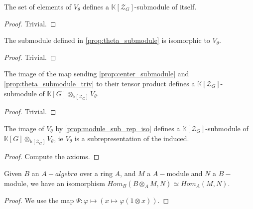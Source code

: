 \begin{proposition}
    \label{prop:theta_submodule}
    \uses{}
    \leanok 
    The set of elements of $V_\theta$ defines a $\mathbb{K}[\mathcal{Z}_G]$-submodule of itself.
\end{proposition}
\begin{proof}
    \leanok
    Trivial.
\end{proof}

\begin{proposition}
    \label{prop:theta_submodule_triv}
    \leanok 
    The submodule defined in \ref{prop:theta_submodule} is isomorphic to $V_\theta$.
\end{proposition}
\begin{proof}
    \leanok
    Trivial.
\end{proof}

\begin{proposition}
    \label{prop:center_times_theta_submodule}
    \leanok 
    The image of the map sending \ref{prop:center_submodule} and \ref{prop:theta_submodule_triv}
    to their tensor product defines a $\mathbb{K}[\mathcal{Z}_G]$-submodule of 
    $\mathbb{K}[G]\otimes_{\mathbb{k}[\mathcal{Z}_G]}V_\theta$.
\end{proposition}
\begin{proof}
    \leanok
    Trivial.
\end{proof}

\begin{proposition}
    \label{prop:subsubsub}
    \leanok 
    The image of $V_\theta$ by \ref{prop:module_sub_rep_iso} defines a $\mathbb{K}[\mathcal{Z}_G]$-submodule of 
    $\mathbb{K}[G]\otimes_{\mathbb{k}[\mathcal{Z}_G]}V_\theta$, ie $V_\theta$ is a 
    subrepresentation of the induced.
\end{proposition}
\begin{proof}
    \leanok
    Compute the axioms.
\end{proof}

\begin{proposition}
    \label{prop:lemma_tensor}
    \uses{}
    \leanok 
    Given $B$ an $A-algebra$ over a ring $A$, and $M$ a $A-$module and $N$
    a $B-$module, we have an isomorphism $Hom_B(B\otimes_A M, N)\simeq Hom_A(M,N)$. 
\end{proposition}
\begin{proof}
    \leanok
    We use the map $\Psi : \varphi \mapsto \left(x\mapsto \varphi (1\otimes x)\right)$.
\end{proof}

